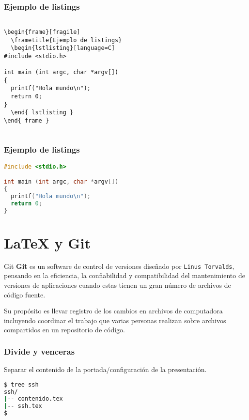 \begin{frame}[fragile]
  \frametitle{Ejemplo de listings}
  \begin{lstlisting}[language={[LaTeX]TeX}]

\begin{frame}[fragile]
  \frametitle{Ejemplo de listings}
  \begin{lstlisting}[language=C]
#include <stdio.h>

int main (int argc, char *argv[])
{
  printf("Hola mundo\n");
  return 0;
}
  \end{ lstlisting }
\end{ frame }


  \end{lstlisting}
\end{frame}

\begin{frame}[fragile]
  \frametitle{Ejemplo de listings}
  \begin{lstlisting}[language=C]
#include <stdio.h>

int main (int argc, char *argv[])
{
  printf("Hola mundo\n");
  return 0;
}
  \end{lstlisting}
\end{frame}

\section{\LaTeX{} y Git}

\begin{frame}[c]{Git}
  \textbf{Git} es un software de control de versiones diseñado por
  \texttt{Linus Torvalds},
  pensando en la eficiencia, la confiabilidad y compatibilidad del
  mantenimiento de versiones de aplicaciones cuando estas tienen un
  gran número de archivos de código fuente.

  \vspace{\baselineskip}
  Su propósito es llevar registro de los cambios en archivos de computadora
  incluyendo coordinar el trabajo que varias personas realizan sobre archivos
  compartidos en un repositorio de código.
\end{frame}


\begin{frame}[fragile]
  \frametitle{Divide y venceras}
  Separar el contenido de la portada/configuración de la presentación.
  \begin{lstlisting}[language=Bash,numbers=none]
$ tree ssh
ssh/
|-- contenido.tex
|-- ssh.tex
$
  \end{lstlisting}
\end{frame}

